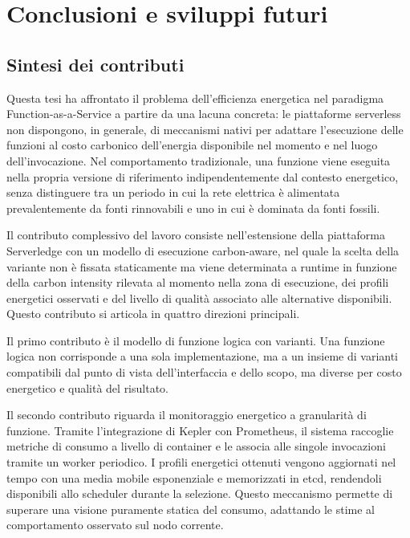 \chapter{Conclusioni e sviluppi futuri}
\label{cap:Conclusioni}

\section{Sintesi dei contributi}

Questa tesi ha affrontato il problema dell'efficienza energetica nel
paradigma Function-as-a-Service a partire da una lacuna concreta: le
piattaforme serverless non dispongono, in generale, di meccanismi nativi
per adattare l'esecuzione delle funzioni al costo carbonico dell'energia
disponibile nel momento e nel luogo dell'invocazione. Nel comportamento
tradizionale, una funzione viene eseguita nella propria versione di
riferimento indipendentemente dal contesto energetico, senza distinguere
tra un periodo in cui la rete elettrica è alimentata prevalentemente da
fonti rinnovabili e uno in cui è dominata da fonti fossili.

Il contributo complessivo del lavoro consiste nell'estensione della
piattaforma Serverledge con un modello di esecuzione carbon-aware, nel
quale la scelta della variante non è fissata staticamente ma viene
determinata a runtime in funzione della carbon intensity rilevata al momento nella zona di esecuzione, dei profili energetici osservati e del livello di qualità associato alle alternative disponibili.
Questo contributo si articola in
quattro direzioni principali.

Il primo contributo è il modello di funzione logica con varianti. Una
funzione logica non corrisponde a una sola implementazione, ma a un insieme
di varianti compatibili dal punto di vista dell'interfaccia e dello scopo,
ma diverse per costo energetico e qualità del risultato.

Il secondo contributo riguarda il monitoraggio energetico a granularità di
funzione. Tramite l'integrazione di Kepler con Prometheus, il sistema
raccoglie metriche di consumo a livello di container e le associa alle
singole invocazioni tramite un worker periodico. I profili energetici
ottenuti vengono aggiornati nel tempo con una media mobile esponenziale e
memorizzati in etcd, rendendoli disponibili allo scheduler durante la
selezione. Questo meccanismo permette di superare una visione puramente
statica del consumo, adattando le stime al comportamento osservato sul nodo
corrente.

